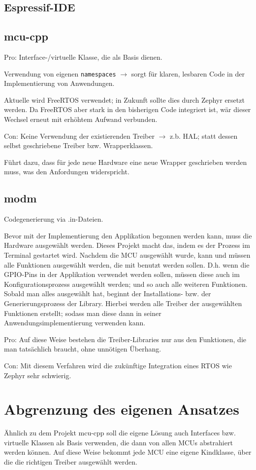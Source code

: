 \subsection{Espressif-IDE}


\subsection{mcu-cpp}
Pro:
Interface-/virtuelle Klasse, die als Basis dienen.

Verwendung von eigenen \texttt{namespaces} $\rightarrow$ sorgt für klaren, lesbaren Code in der Implementierung von Anwendungen.

Aktuelle wird FreeRTOS verwendet; in Zukunft sollte dies durch Zephyr ersetzt werden.
Da FreeRTOS aber stark in den bisherigen Code integriert ist, wär dieser Wechsel erneut mit erhöhtem Aufwand verbunden.



Con:
Keine Verwendung der existierenden Treiber $\rightarrow$ z.b. HAL; statt dessen selbst geschriebene Treiber bzw. Wrapperklassen.

Führt dazu, dass für jede neue Hardware eine neue Wrapper geschrieben werden muss, was den Anfordungen widerspricht.

\subsection{modm}
Codegenerierung via .in-Dateien.

Bevor mit der Implementierung den Applikation begonnen werden kann, muss die Hardware ausgewählt werden.
Dieses Projekt macht das, indem es der Prozess im Terminal gestartet wird.
Nachdem die MCU ausgewählt wurde, kann und müssen alle Funktionen ausgewählt werden, die mit benutzt werden sollen.
D.h. wenn die GPIO-Pins in der Applikation verwendet werden sollen, müssen diese auch im Konfigurationsprozess ausgewählt werden; und so auch alle weiteren Funktionen.
Sobald man alles ausgewählt hat, beginnt der Installations- bzw. der Generierungsprozess der Library. 
Hierbei werden alle Treiber der ausgewählten Funktionen erstellt; sodass man diese dann in seiner Anwendungsimplementierung verwenden kann.

Pro:
Auf diese Weise bestehen die Treiber-Libraries nur aus den Funktionen, die man tatsächlich braucht, ohne unnötigen Überhang.

Con:
Mit diesem Verfahren wird die zukünftige Integration eines RTOS wie Zephyr sehr schwierig.

\section{Abgrenzung des eigenen Ansatzes}
Ähnlich zu dem Projekt mcu-cpp soll die eigene Lösung auch Interfaces bzw. virtuelle Klassen als Basis verwenden, die dann von allen MCUs abstrahiert werden können.
Auf diese Weise bekommt jede MCU eine eigene Kindklasse, über die die richtigen Treiber ausgewählt werden.










